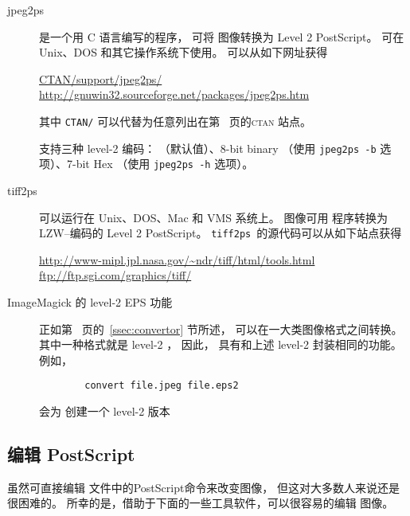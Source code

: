 \begin{description}
	\item[jpeg2ps] 
	
	 是一个用 C 语言编写的程序，
	可将 图像转换为 Level 2 PostScript。
	 可在 Unix、DOS 和其它操作系统下使用。
	 可以从如下网址获得
	\begin{center}
		\href{http://www.ctan.org/tex-archive/support/jpeg2ps}{CTAN/support/jpeg2ps/}\\
		\url{http://gnuwin32.sourceforge.net/packages/jpeg2ps.htm}
	\end{center}
	其中 \texttt{CTAN/} 可以代替为任意列出在第~\pageref{ctan-sites} 页的\textsc{ctan} 站点。
	
	 支持三种 level-2 编码：
	 （默认值）、8-bit binary （使用 \verb|jpeg2ps -b| 选项）、7-bit \ascii Hex （使用 \verb|jpeg2ps -h| 选项）。

	\item[tiff2ps]
	
	 可以运行在 Unix、DOS、Mac 和 VMS 系统上。
	 图像可用 程序转换为 LZW--编码的 Level 2 PostScript。
	\texttt{tiff2ps}~的源代码可以从如下站点获得
	\begin{center}
		\url{http://www-mipl.jpl.nasa.gov/~ndr/tiff/html/tools.html}\\
		\url{ftp://ftp.sgi.com/graphics/tiff/}
	\end{center}
	
	\item[ImageMagick 的 level-2 EPS 功能]
	
	正如第~\pageref{ssec:convertor} 页的~\ref{ssec:convertor} 节所述，
	 可以在一大类图像格式之间转换。
	其中一种格式就是 level-2 ，
	因此， 具有和上述 level-2 封装相同的功能。
	例如，
\begin{verbatim}
		convert file.jpeg file.eps2
\end{verbatim}
	会为  创建一个 level-2  版本 
	
\end{description}

\subsection{编辑 PostScript}\label{ssec:editps}

虽然可直接编辑  文件中的PostScript命令来改变图像，
但这对大多数人来说还是很困难的。
所幸的是，借助于下面的一些工具软件，可以很容易的编辑  图像。

